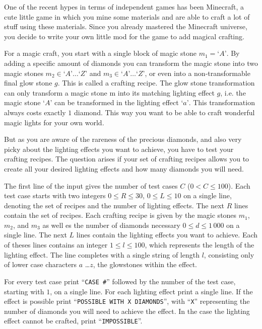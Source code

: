 One of the recent hypes in terms of independent games has been Minecraft, a cute little game in which you mine some materials and are able to craft a lot of stuff using these materials.
Since you already mastered the Minecraft universe, you decide to write your own little mod for the game to add magical crafting.

For a magic craft, you start with a single block of magic stone $m_1 = \text{`}A\text{'}$.
By adding a specific amount of diamonds you can transform the magic stone into two magic stones $m_2 \in \text{`}A\text{'} \dots \text{`}Z\text{'}$ and $m_3 \in \text{`}A\text{'} \dots \text{`}Z\text{'}$, or even into a non-transformable final glow stone $g$.
This is called a crafting recipe.
The glow stone transformation can only transform a magic stone m into its matching lighting effect $g$, i.e. the magic stone $\text{`}A\text{'}$ can be transformed in the lighting effect $\text{`}a\text{'}$.
This transformation always costs exactly $1$ diamond.
This way you want to be able to craft wonderful magic lights for your own world.

But as you are aware of the rareness of the precious diamonds, and also very picky about the lighting effects you want to achieve, you have to test your crafting recipes.
The question arises if your set of crafting recipes allows you to create all your desired lighting effects and how many diamonds you will need.

\begin{Input}
    The first line of the input gives the number of test cases $C$ ($0 < C \leq 100$).
    Each test case starts with two integers $0 \leq R \leq 30$, $0 \leq L \leq 10$ on a single line, denoting the set of recipes and the number of lighting effects.
    The next $R$ lines contain the set of recipes.
    Each crafting recipe is given by the magic stones $m_1$, $m_2$, and $m_3$ as well es the number of diamonds necessary $0 \leq d \leq 1\,000$ on a single line.
    The next $L$ lines contain the lighting effects you want to achieve.
    Each of theses lines contains an integer $1 \leq l \leq 100$, which represents the length of the lighting effect.
    The line completes with a single string of length $l$, consisting only of lower case characters $a$ \dots $z$, the glowstones within the effect.
\end{Input}

\begin{Output}
    For every test case print ``\texttt{CASE \#}'' followed by the number of the test case, starting with $1$, on a single line.
    For each lighting effect print a single line.
    If the effect is possible print ``\texttt{POSSIBLE WITH X DIAMONDS}'', with ``\texttt{X}'' representing the number of diamonds you will need to achieve the effect.
    In the case the lighting effect cannot be crafted, print ``\texttt{IMPOSSIBLE}''.
\end{Output}

